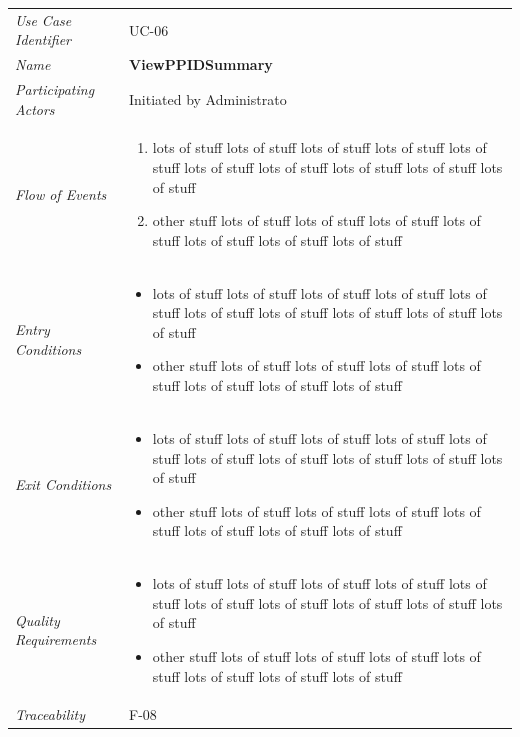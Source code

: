 \documentclass[12pt,letterpaper]{article}
\begin{document}
\begin{center}
	\begin{tabu} to 
		\toprule
		Use Case Identifier & UC-06 \\
		Name & {\bf ViewPPIDSummary} \\
		Participating Actors & Initiated by Administrato \\
		Flow of Events & 
	    \begin{enumerate}[topsep=-1em]
		    \item lots of stuff lots of stuff lots of stuff lots of stuff lots of stuff lots of stuff lots of stuff lots of stuff lots of stuff lots of stuff
		    \item other stuff lots of stuff lots of stuff lots of stuff lots of stuff lots of stuff lots of stuff lots of stuff
		\end{enumerate} \\

		Entry Conditions &
		\begin{itemize}[topsep=-1em]
		    \item lots of stuff lots of stuff lots of stuff lots of stuff lots of stuff lots of stuff lots of stuff lots of stuff lots of stuff lots of stuff
		    \item other stuff lots of stuff lots of stuff lots of stuff lots of stuff lots of stuff lots of stuff lots of stuff
        \end{itemize} \\

		Exit Conditions &
		\begin{itemize}[topsep=-1em]
		    \item lots of stuff lots of stuff lots of stuff lots of stuff lots of stuff lots of stuff lots of stuff lots of stuff lots of stuff lots of stuff
		    \item other stuff lots of stuff lots of stuff lots of stuff lots of stuff lots of stuff lots of stuff lots of stuff
        \end{itemize} \\

		Quality Requirements &
		\begin{itemize}[topsep=-1em]
		    \item lots of stuff lots of stuff lots of stuff lots of stuff lots of stuff lots of stuff lots of stuff lots of stuff lots of stuff lots of stuff
		    \item other stuff lots of stuff lots of stuff lots of stuff lots of stuff lots of stuff lots of stuff lots of stuff
        \end{itemize} \\

		Traceability & F-08 \\
		\toprule
	\end{tabu}
\end{center}
\end{document}
